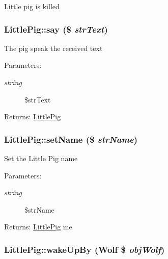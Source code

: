 Little pig is killed \hypertarget{class_little_pig_e1b8d158165b0d2af05ab13942954c03}{
\subsubsection[{say}]{\setlength{\rightskip}{0pt plus 5cm}LittlePig::say (\$ {\em strText})}}
\label{class_little_pig_e1b8d158165b0d2af05ab13942954c03}


The pig speak the received text

\begin{Desc}
\item[Parameters:]
\begin{description}
\item[{\em string}]\$strText \end{description}
\end{Desc}
\begin{Desc}
\item[Returns:]\hyperlink{class_little_pig}{LittlePig} \end{Desc}
\hypertarget{class_little_pig_6ef9513d6d9d02d9ed83bb18db30b150}{
\subsubsection[{setName}]{\setlength{\rightskip}{0pt plus 5cm}LittlePig::setName (\$ {\em strName})}}
\label{class_little_pig_6ef9513d6d9d02d9ed83bb18db30b150}


Set the Little Pig name

\begin{Desc}
\item[Parameters:]
\begin{description}
\item[{\em string}]\$strName \end{description}
\end{Desc}
\begin{Desc}
\item[Returns:]\hyperlink{class_little_pig}{LittlePig} me \end{Desc}
\hypertarget{class_little_pig_32b61646743334117a7f9fac62a9099c}{
\subsubsection[{wakeUpBy}]{\setlength{\rightskip}{0pt plus 5cm}LittlePig::wakeUpBy ({\bf Wolf} \$ {\em objWolf})}}
\label{class_little_pig_32b61646743334117a7f9fac62a9099c}


